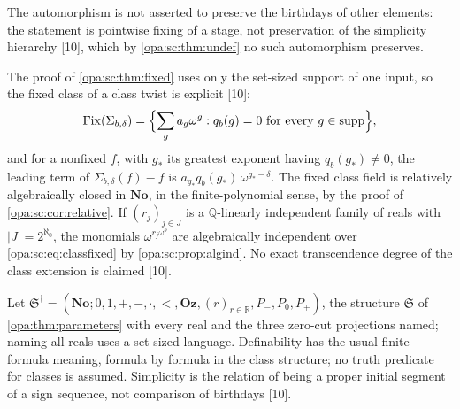 \documentclass[11pt,oneside]{article}
\numberwithin{equation}{section}
\theoremstyle{definition}
\theoremstyle{remark}
\newcommand{\No}{\mathbf{No}}
\newcommand{\Oz}{\mathbf{Oz}}
\newcommand{\R}{\mathbb R}
\newcommand{\Q}{\mathbb Q}
\newcommand{\supp}{\operatorname{supp}}
\newcommand{\Fix}{\operatorname{Fix}}
\newcommand{\src}[1]{\textup{\textsf{\small[#1]}}}
\begin{document}
The automorphism is not asserted to preserve the birthdays of other elements:
the statement is pointwise fixing of a stage, not preservation of the simplicity
hierarchy \src{10}, which by \cref{opa:sc:thm:undef} no such automorphism
preserves.

The proof of \cref{opa:sc:thm:fixed} uses only the set-sized support of one
input, so the fixed class of a class twist is explicit \src{10}:
\begin{equation}\label{opa:sc:eq:classfixed}
 \Fix(\Sigma_{b,\delta})=\Bigl\{\sum_ga_g\omega^g:q_b(g)=0\text{ for every }g\in\supp\Bigr\},
\end{equation}
and for a nonfixed $f$, with $g_*$ its greatest exponent having $q_b(g_*)\ne0$, the
leading term of $\Sigma_{b,\delta}(f)-f$ is $a_{g_*}q_b(g_*)\,\omega^{g_*-\delta}$. The
fixed class field is relatively algebraically closed in $\No$, in the
finite-polynomial sense, by the proof of \cref{opa:sc:cor:relative}. If
$(r_j)_{j\in J}$ is a $\Q$-linearly independent family of reals with
$|J|=2^{\aleph_0}$, the monomials $\omega^{r_j\omega^b}$ are algebraically
independent over \eqref{opa:sc:eq:classfixed} by \cref{opa:sc:prop:algind}. No
exact transcendence degree of the class extension is claimed \src{10}.

Let $\mathfrak S^\dagger=(\No;0,1,+,-,\cdot,<,\Oz,(r)_{r\in\R},P_-,P_0,P_+)$, the
structure $\mathfrak S$ of \cref{opa:thm:parameters} with every real and the
three zero-cut projections named; naming all reals uses a set-sized language.
Definability has the usual finite-formula meaning, formula by formula in the
class structure; no truth predicate for classes is assumed. Simplicity is the
relation of being a proper initial segment of a sign sequence, not comparison
of birthdays \src{10}.
\end{document}
